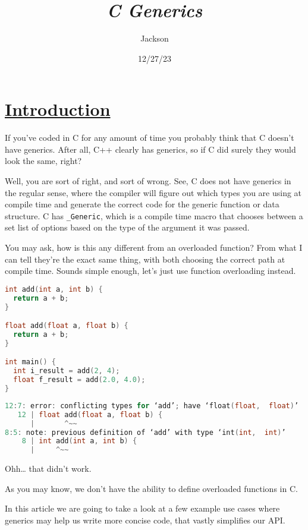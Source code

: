 \documentclass[11pt]{article}
\author{Jackson}
\date{12/27/23}
\title{\emph{C Generics}}
\begin{document}
\maketitle
\section*{\underline{Introduction}}
\label{sec:org2420c53}
If you've coded in C for any amount of time you probably think that C doesn't have generics. After all, C++ clearly has generics, so if C did surely they would look the same, right?

Well, you are sort of right, and sort of wrong. See, C does not have generics in the regular sense, where the compiler will figure out which types you are using at compile time and generate the correct code for the generic function or data structure. C has \texttt{\_Generic}, which is a compile time macro that chooses between a set list of options based on the type of the argument it was passed.

You may ask, how is this any different from an overloaded function? From what I can tell they're the exact same thing, with both choosing the correct path at compile time. Sounds simple enough, let's just use function overloading instead.

\begin{lstlisting}[language=C,numbers=none]
int add(int a, int b) {
  return a + b;
}

float add(float a, float b) {
  return a + b;
}

int main() {
  int i_result = add(2, 4);
  float f_result = add(2.0, 4.0);
}
\end{lstlisting}

\begin{lstlisting}[language=C,numbers=none]
12:7: error: conflicting types for ‘add’; have ‘float(float,  float)’
   12 | float add(float a, float b) {
      |       ^~~
8:5: note: previous definition of ‘add’ with type ‘int(int,  int)’
    8 | int add(int a, int b) {
      |     ^~~
\end{lstlisting}

Ohh\ldots{} that didn't work.

As you may know, we don't have the ability to define overloaded functions in C.

In this article we are going to take a look at a few example use cases where generics may help us write more concise code, that vastly simplifies our API.
\end{document}
